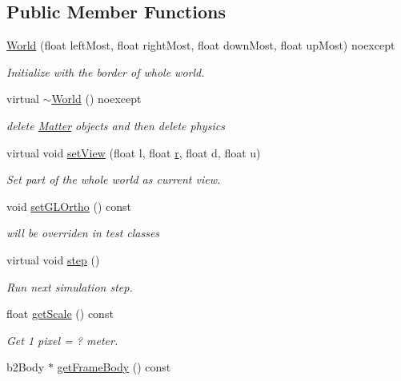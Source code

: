 \subsection*{Public Member Functions}
\begin{DoxyCompactItemize}
\item 
\hyperlink{classWorld_a18f20395a332752c4a3d98f2b0e98cff}{World} (float left\+Most, float right\+Most, float down\+Most, float up\+Most) noexcept
\begin{DoxyCompactList}\small\item\em Initialize with the border of whole world. \end{DoxyCompactList}\item 
virtual \hyperlink{classWorld_adf6c3b010a0b8eb87805a5bc71b8924c}{$\sim$\+World} () noexcept
\begin{DoxyCompactList}\small\item\em delete \hyperlink{classMatter}{Matter} objects and then delete physics \end{DoxyCompactList}\item 
virtual void \hyperlink{classWorld_a2675f967ea85876d123357c2ffafc7ea}{set\+View} (float l, float \hyperlink{image_8h_a62969232668331297e2dca1ae2ddd10d}{r}, float d, float u)
\begin{DoxyCompactList}\small\item\em Set part of the whole world as current view. \end{DoxyCompactList}\item 
void \hyperlink{classWorld_a4fedfa711acf1d711333f63d28692879}{set\+G\+L\+Ortho} () const 
\begin{DoxyCompactList}\small\item\em will be overriden in test classes \end{DoxyCompactList}\item 
virtual void \hyperlink{classWorld_a63a22c1ea89297d49095004c79d40ce6}{step} ()
\begin{DoxyCompactList}\small\item\em Run next simulation step. \end{DoxyCompactList}\item 
float \hyperlink{classWorld_aae107a7cff8f2a7ed88b74248f33d5a3}{get\+Scale} () const 
\begin{DoxyCompactList}\small\item\em Get 1 pixel = ? meter. \end{DoxyCompactList}\item 
b2\+Body $\ast$ \hyperlink{classWorld_a216fe468428599cef4058dd704d3dfc6}{get\+Frame\+Body} () const 

\end{DoxyCompactItemize}
